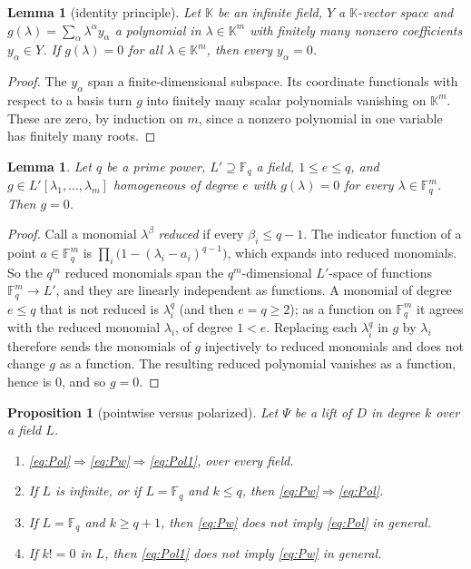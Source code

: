 \documentclass[11pt]{amsart}
\newtheorem{lemma}[theorem]{Lemma}
\newtheorem{proposition}[theorem]{Proposition}
\theoremstyle{definition}
\theoremstyle{remark}
\numberwithin{equation}{section}
\newcommand{\F}{\mathbb{F}}
\begin{document}
\begin{lemma}[identity principle]\label{lem:idprinc}
Let $\mathbb K$ be an infinite field, $Y$ a $\mathbb K$\nobreakdash-vector space and $g(\lambda)=\sum_\alpha\lambda^\alpha y_\alpha$ a
polynomial in $\lambda\in\mathbb K^m$ with finitely many nonzero coefficients $y_\alpha\in Y$. If $g(\lambda)=0$ for all
$\lambda\in\mathbb K^m$, then every $y_\alpha=0$.
\end{lemma}

\begin{proof}
The $y_\alpha$ span a finite-dimensional subspace. Its coordinate functionals with respect to a basis turn $g$ into
finitely many scalar polynomials vanishing on $\mathbb K^m$. These are zero, by induction on $m$, since a nonzero
polynomial in one variable has finitely many roots.
\end{proof}

\begin{lemma}\label{lem:forms}
Let $q$ be a prime power, $L'\supseteq\F_q$ a field, $1\le e\le q$, and $g\in L'[\lambda_1,\dots,\lambda_m]$ homogeneous of
degree $e$ with $g(\lambda)=0$ for every $\lambda\in\F_q^m$. Then $g=0$.
\end{lemma}

\begin{proof}
Call a monomial $\lambda^\beta$ \emph{reduced} if every $\beta_i\le q-1$. The indicator function of a point
$a\in\F_q^m$ is $\prod_i\bigl(1-(\lambda_i-a_i)^{q-1}\bigr)$, which expands into reduced monomials. So the $q^m$ reduced
monomials span the $q^m$\nobreakdash-dimensional $L'$\nobreakdash-space of functions $\F_q^m\to L'$, and they are linearly independent as
functions. A monomial of degree $e\le q$ that is not reduced is $\lambda_i^q$ (and then $e=q\ge2$); as a function on
$\F_q^m$ it agrees with the reduced monomial $\lambda_i$, of degree $1<e$. Replacing each $\lambda_i^q$ in $g$ by
$\lambda_i$ therefore sends the monomials of $g$ injectively to reduced monomials and does not change $g$ as a
function. The resulting reduced polynomial vanishes as a function, hence is $0$, and so $g=0$.
\end{proof}

\begin{proposition}[pointwise versus polarized]\label{prop:diag}
Let $\Psi$ be a lift of $D$ in degree $k$ over a field $L$.
\begin{enumerate}
\item \eqref{eq:Pol}$\Rightarrow$\eqref{eq:Pw}$\Rightarrow$\eqref{eq:Pol1}, over every field.
\item If $L$ is infinite, or if $L=\F_q$ and $k\le q$, then \eqref{eq:Pw}$\Rightarrow$\eqref{eq:Pol}.
\item If $L=\F_q$ and $k\ge q+1$, then \eqref{eq:Pw} does not imply \eqref{eq:Pol} in general.
\item If $k!=0$ in $L$, then \eqref{eq:Pol1} does not imply \eqref{eq:Pw} in general.
\end{enumerate}
\end{proposition}
\end{document}
